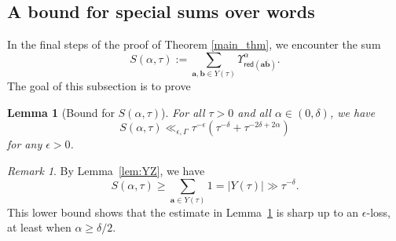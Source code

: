\documentclass[12pt,letterpaper]{amsart}
\theoremstyle{plain}
\newtheorem{lemma}[prop]{Lemma}
\theoremstyle{definition}
\theoremstyle{remark}
\newtheorem{remark}[prop]{Remark}
\newcommand{\Aa}{\textbf{a}}
\newcommand{\Bb}{\textbf{b}}
\begin{document}
\subsection{A bound for special sums over words}\label{sec:certainSum}
In the final steps of the proof of Theorem \ref{main_thm}, we encounter the sum
$$
S(\alpha, \tau) := \sum_{\Aa,\Bb \in Y(\tau)} \Upsilon_{\mathsf{red}(\Aa\overline{\Bb})}^{\alpha}.
$$
The goal of this subsection is to prove
\begin{lemma}[Bound for $S(\alpha, \tau)$]\label{lem:weird_sum}
For all $\tau > 0$ and all $\alpha \in (0,\delta)$, we have
\begin{equation}\label{eq:weird_sum}
S(\alpha, \tau) \ll_{\epsilon, \Gamma} \tau^{-\epsilon} \left(\tau^{-\delta} +  \tau^{- 2\delta + 2\alpha} \right)
\end{equation}
for any $\epsilon > 0$.
\end{lemma}

\begin{remark}\label{rmk:trivial}
By Lemma~\ref{lem:YZ}, we have
\[
S(\alpha, \tau) \ge \sum_{\Aa \in Y(\tau)} 1 = |Y(\tau)| \gg \tau^{-\delta}.
\]
This lower bound shows that the estimate in Lemma~\ref{lem:weird_sum} is sharp up to an $\epsilon$-loss, at least when $\alpha \ge \delta/2$.
\end{remark}
\end{document}
